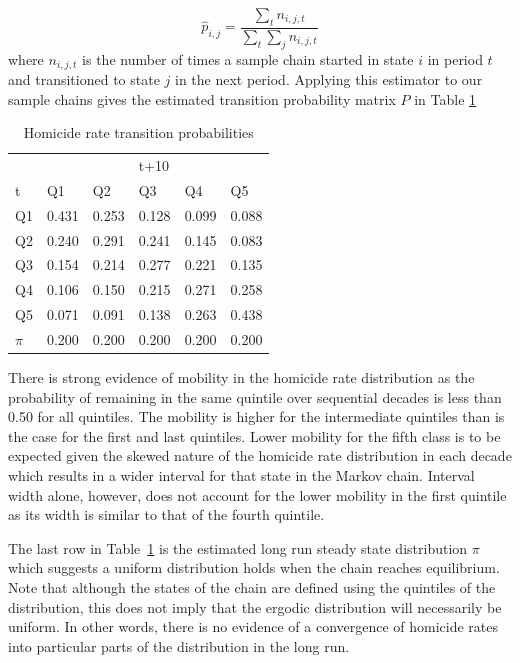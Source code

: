 \documentclass[11pt, titlepage]{amsart}
\begin{document}
\begin{equation}
\hat{p}_{i,j} = \frac{\sum_t n_{i,j,t}}{\sum_t \sum_j n_{i,j,t}} 
\label{e:cm}
\end{equation}
where $n_{i,j,t}$ is the number of times a sample chain started in state $i$
in period $t$ and transitioned to state $j$ in the next period. Applying this estimator
to our sample chains gives the  estimated transition
probability matrix $P$ in Table \ref{t:cm}

\begin{table}
  \centering
  \small
\begin{tabular}{|l|lllll|}\hline
   &  &  &t+10& & \\
  t&Q1&Q2&Q3&Q4&Q5\\
  \hline
   Q1& 0.431&0.253&0.128&0.099&0.088\\
   Q2& 0.240&0.291&0.241&0.145&0.083\\
   Q3& 0.154&0.214&0.277&0.221&0.135\\
   Q4& 0.106&0.150&0.215&0.271&0.258\\
   Q5& 0.071&0.091&0.138&0.263&0.438\\
    \hline
    $\pi$&0.200&0.200&0.200&0.200&0.200\\
    \hline
\end{tabular}
\caption{Homicide rate transition probabilities}
\label{t:cm}
\end{table}

There is strong evidence of mobility in the homicide rate distribution
as the probability of remaining in the same quintile over sequential
decades is less than 0.50 for all quintiles. The mobility is higher for
the intermediate quintiles than is the case for the first and last
quintiles. Lower mobility for the fifth class is to be expected given
the skewed nature of the homicide rate distribution in each decade which
results in a wider interval for that state in the Markov chain. Interval
width alone, however, does not account for the lower mobility in the
first quintile as its width is similar to that of the fourth quintile.

The last row in Table~\ref{t:cm} is the estimated long run steady state
distribution $\pi$ which suggests a uniform distribution holds when the chain
reaches equilibrium. Note that although the states of the chain are
defined using the quintiles of the distribution, this does not imply
that the ergodic distribution will necessarily be uniform. In other
words, there is no evidence of a convergence of homicide rates into
particular parts of the distribution in the long run.
\end{document}
